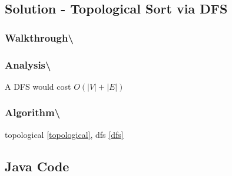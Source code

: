 \documentclass[]{book}
\begin{document}
\hypertarget{solution---topological-sort-via-dfs}{%
\subsection{Solution - Topological Sort via DFS}\label{solution---topological-sort-via-dfs}}

\hypertarget{walkthrough-96}{%
\subsubsection{Walkthrough\textbackslash{}}\label{walkthrough-96}}

\hypertarget{analysis-103}{%
\subsubsection{Analysis\textbackslash{}}\label{analysis-103}}

A DFS would cost \(O(|V| + |E|)\)

\hypertarget{algorithm-109}{%
\subsubsection{Algorithm\textbackslash{}}\label{algorithm-109}}

topological \ref{topological}, dfs \ref{dfs}

\hypertarget{java-code-64}{%
\subsection{Java Code}\label{java-code-64}}
\end{document}
